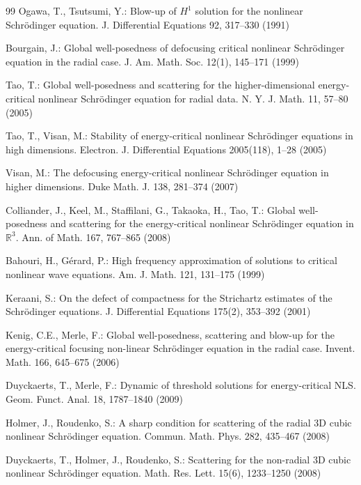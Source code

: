 \documentclass[smallextended,envcountsect,nospthms]{svjour3}
\numberwithin{equation}{section}
\theoremstyle{spbreak}
\theoremstyle{spdefbreak}
\theoremstyle{spdefbreak}
\begin{document}
\begin{thebibliography}{99}
Ogawa, T., Tsutsumi, Y.: Blow-up of $H^1$ solution for the nonlinear Schr\"odinger equation. J. Differential Equations 92, 317--330 (1991)

Bourgain, J.: Global well-posedness of defocusing critical nonlinear Schr\"odinger equation in the radial case. J. Am. Math. Soc. 12(1), 145--171 (1999)

Tao, T.: Global well-posedness and scattering for the higher-dimensional energy-critical nonlinear Schr\"odinger equation for radial data. N. Y. J. Math. 11, 57--80 (2005)

Tao, T., Visan, M.: Stability of energy-critical nonlinear Schr\"odinger equations in high dimensions. Electron. J. Differential Equations 2005(118), 1--28 (2005)

Visan, M.: The defocusing energy-critical nonlinear Schr\"odinger equation in higher dimensions. Duke Math. J. 138, 281--374 (2007)

Colliander, J., Keel, M., Staffilani, G., Takaoka, H., Tao, T.: Global well-posedness and scattering for the energy-critical nonlinear Schr\"odinger equation in $\mathbb R^3$. Ann. of Math. 167, 767--865 (2008)

Bahouri, H., G\'erard, P.: High frequency approximation of solutions to critical nonlinear wave equations. Am. J. Math. 121, 131--175 (1999)

Keraani, S.: On the defect of compactness for the Strichartz estimates of the Schr\"odinger equations. J. Differential Equations 175(2), 353--392 (2001)

Kenig, C.E., Merle, F.: Global well-posedness, scattering and blow-up for the energy-critical focusing non-linear Schr\"odinger equation in the radial case. Invent. Math. 166, 645--675 (2006)

Duyckaerts, T., Merle, F.: Dynamic of threshold solutions for energy-critical NLS. Geom. Funct. Anal. 18, 1787--1840 (2009)

Holmer, J., Roudenko, S.: A sharp condition for scattering of the radial 3D cubic nonlinear Schr\"odinger equation. Commun. Math. Phys. 282, 435--467 (2008)

Duyckaerts, T., Holmer, J., Roudenko, S.: Scattering for the non-radial 3D cubic nonlinear Schr\"odinger equation. Math. Res. Lett. 15(6), 1233--1250 (2008)


\end{thebibliography}
\end{document}
